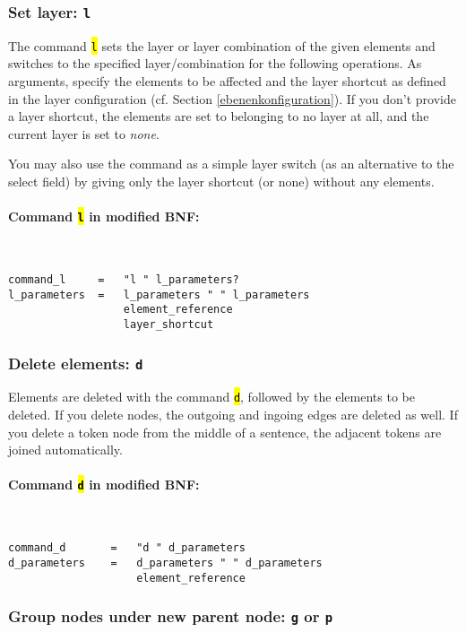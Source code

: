 \documentclass[12pt]{scrartcl}
\newcommand{\code}[1]{\hl{\texttt{#1}}}
\begin{document}
\subsubsection{Set layer: \texttt{l}}\label{befehl-l}

The command \code{l} sets the layer or layer combination of the given elements and switches to the specified layer/combination for the following operations.
As arguments, specify the elements to be affected and the layer shortcut as defined in the layer configuration (cf. Section \ref{ebenenkonfiguration}).
If you don’t provide a layer shortcut, the elements are set to belonging to no layer at all, and the current layer is set to \textit{none}.

You may also use the command as a simple layer switch (as an alternative to the select field) by giving only the layer shortcut (or none) without any elements.

\paragraph*{Command \code{l} in modified BNF:}
~
\begin{lstlisting}
command_l     =   "l " l_parameters?
l_parameters  =   l_parameters " " l_parameters
                  element_reference
                  layer_shortcut
\end{lstlisting}


\subsubsection{Delete elements: \texttt{d}}

Elements are deleted with the command \code{d}, followed by the elements to be deleted.
If you delete nodes, the outgoing and ingoing edges are deleted as well.
If you delete a token node from the middle of a sentence, the adjacent tokens are joined automatically.

\paragraph*{Command \code{d} in modified BNF:}
~
\begin{lstlisting}
command_d       =   "d " d_parameters
d_parameters    =   d_parameters " " d_parameters
                    element_reference
\end{lstlisting}


\subsubsection{Group nodes under new parent node: \texttt{g} or \texttt{p}}
\end{document}
